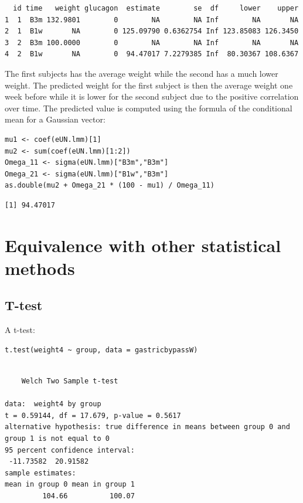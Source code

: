 \documentclass[12pt]{article}
\begin{document}
\begin{verbatim}
  id time   weight glucagon  estimate        se  df     lower    upper
1  1  B3m 132.9801        0        NA        NA Inf        NA       NA
2  1  B1w       NA        0 125.09790 0.6362754 Inf 123.85083 126.3450
3  2  B3m 100.0000        0        NA        NA Inf        NA       NA
4  2  B1w       NA        0  94.47017 7.2279385 Inf  80.30367 108.6367
\end{verbatim}


The first subjects has the average weight while the second has a much
  lower weight. The predicted weight for the first subject is then the
  average weight one week before while it is lower for the second
  subject due to the positive correlation over time. The predicted
  value is computed using the formula of the conditional mean for a
  Gaussian vector:
\lstset{language=r,label= ,caption= ,captionpos=b,numbers=none}
\begin{lstlisting}
mu1 <- coef(eUN.lmm)[1]
mu2 <- sum(coef(eUN.lmm)[1:2])
Omega_11 <- sigma(eUN.lmm)["B3m","B3m"]
Omega_21 <- sigma(eUN.lmm)["B1w","B3m"]
as.double(mu2 + Omega_21 * (100 - mu1) / Omega_11)
\end{lstlisting}

\begin{verbatim}
[1] 94.47017
\end{verbatim}



\clearpage

\section{Equivalence with other statistical methods}
\label{sec:orge17d74b}
\subsection{T-test}
\label{sec:org2ff7a25}
A t-test:
\lstset{language=r,label= ,caption= ,captionpos=b,numbers=none}
\begin{lstlisting}
t.test(weight4 ~ group, data = gastricbypassW)
\end{lstlisting}

\begin{verbatim}

	Welch Two Sample t-test

data:  weight4 by group
t = 0.59144, df = 17.679, p-value = 0.5617
alternative hypothesis: true difference in means between group 0 and group 1 is not equal to 0
95 percent confidence interval:
 -11.73582  20.91582
sample estimates:
mean in group 0 mean in group 1 
         104.66          100.07
\end{verbatim}
\end{document}
